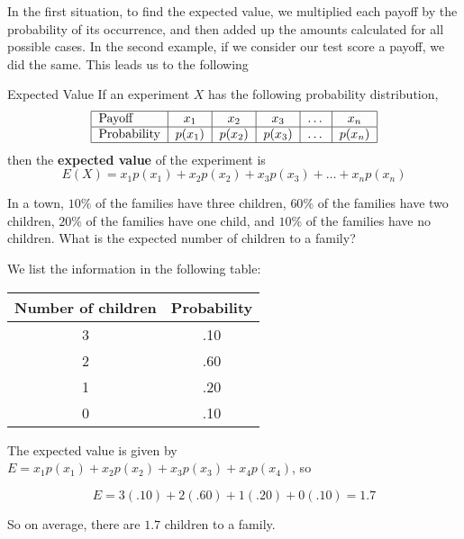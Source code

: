 In the first situation, to find the expected value, we multiplied each payoff by the probability of its occurrence, and then added up the amounts calculated for all possible cases. In the second example, if we consider our test score a payoff, we did the same. This leads us to the following

\begin{summarybox}{Expected Value}
    If an experiment $X$ has the following probability distribution,
    \[
        \begin{tabular}{|l|c|c|c|c|c|}
            \hline
            Payoff      & \( x_1 \)    & \( x_2 \)    & \( x_3 \)    & \ldots & \( x_n \)    \\
            \hline
            Probability & \( p(x_1) \) & \( p(x_2) \) & \( p(x_3) \) & \ldots & \( p(x_n) \) \\
            \hline
        \end{tabular}
    \]
    then the \textbf{expected value} of the experiment is
    \[
        E(X) = x_1p(x_1) + x_2p(x_2) + x_3p(x_3) + \ldots + x_np(x_n)
    \]
\end{summarybox}

\begin{example}
    In a town, \(10\%\) of the families have three children, \(60\%\) of the families have two children, \(20\%\) of the families have one child, and \(10\%\) of the families have no children. What is the expected number of children to a family?
\end{example}

\begin{solution}
    We list the information in the following table:
    \begin{center}
        \begin{tabular}{cc}
            \hline
            Number of children & Probability \\
            \hline
            3                  & .10         \\
            2                  & .60         \\
            1                  & .20         \\
            0                  & .10         \\
            \hline
        \end{tabular}
    \end{center}

    The expected value is given by \( E = x_1p(x_1) + x_2p(x_2) + x_3p(x_3) + x_4p(x_4) \), so

    \[ E = 3(.10) + 2(.60) + 1(.20) + 0(.10) = 1.7 \]

    So on average, there are \( 1.7 \) children to a family.
\end{solution}

